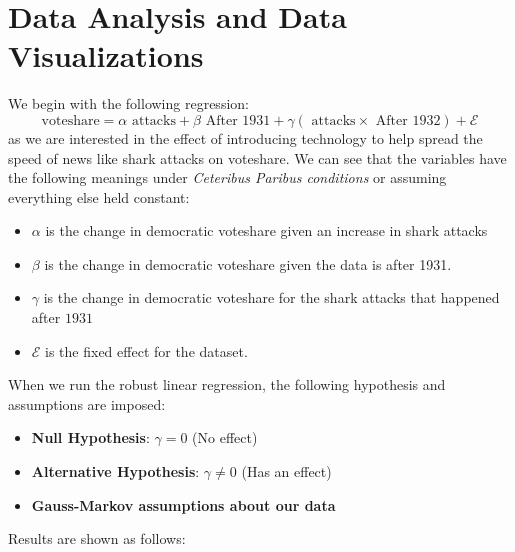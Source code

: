 \documentclass[12pt]{article}
\begin{document}
\section{Data Analysis and Data Visualizations}
We begin with the following regression:
\[
\text{voteshare} = \alpha \text{  attacks} + \beta \text{  After 1931} + \gamma (\text{  attacks} \times \text{  After 1932}) + \mathcal{E}
\]
as we are interested in the effect of introducing technology to help spread the speed of news like shark attacks on voteshare. We can see that 
the variables have the following meanings under \emph{Ceteribus Paribus conditions} or assuming everything else held constant: 
\begin{itemize}
    \item $\alpha$ is the change in democratic voteshare given an increase in shark attacks
    \item $\beta$ is the change in democratic voteshare given the data is after 1931. 
    \item $\gamma$ is the change in democratic voteshare for the shark attacks that happened after $1931$
    \item $\mathcal{E}$ is the fixed effect for the dataset. 
\end{itemize}
When we run the robust linear regression, the following hypothesis and assumptions are imposed: 
\begin{itemize}
    \item \textbf{Null Hypothesis}: $\gamma = 0$ (No effect)
    \item \textbf{Alternative Hypothesis}: $\gamma \neq 0$ (Has an effect)
    \item \textbf{Gauss-Markov assumptions about our data}
\end{itemize}
Results are shown as follows:
\begin{table}[H]
    \centering
    \caption{Difference-in-Differences Regression Results}
\end{table}
\end{document}
